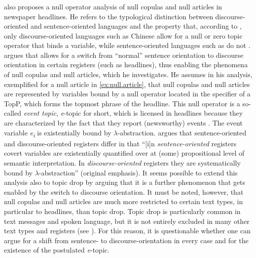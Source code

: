 \largerpage
\subsubsection{\citet{reich2017}}
\citet{reich2017} also proposes a null operator analysis of null copulas and null articles in newspaper headlines. 
He refers to the typological distinction between discourse-oriented and sentence-oriented languages \citep{tsao1977, huang1984} and the property that, according to \citet[545]{huang1984}, only discourse-oriented languages such as Chinese  allow for a null or zero topic operator that binds a variable, while sentence-oriented languages such as  do not \citep[192]{reich2017}.
\citet[193]{reich2017} argues that  allows for a switch from ``normal'' sentence orientation to discourse orientation in certain registers (such as headlines), thus enabling the phenomena of null copulas and null articles, which he investigates.
He assumes in his analysis, exemplified for a null article in \ref{ex:null.article}, that null copulas and null articles are represented by variables bound by a null operator located in the specifier of a TopP, which forms the topmost phrase of the headline.
This null operator is a so-called \textit{event topic}, \textit{e}-topic for short, which is licensed in headlines because they are characterized by the fact that they report (newsworthy) events \citep[193]{reich2017}.
The event variable \textit{e\textsubscript{i}} is existentially bound by $\lambda$-abstraction.
\citet[194]{reich2017} argues that sentence-oriented and discourse-oriented registers differ in that ``[i]n \textit{sentence-oriented} registers covert variables are existentially quantified over at (some) propositional level of semantic interpretation.
In \textit{discourse-oriented} registers they are systematically bound by $\lambda$-abstraction'' (original emphasis).
It seems possible to extend this analysis also to topic drop by arguing that it is a further phenomenon that gets enabled by the switch to discourse orientation.
It must be noted, however, that null copulas and null articles are much more restricted to certain text types,  in particular to headlines, than topic drop.
Topic drop is particularly common in text messages and spoken language, but it is not entirely excluded in many other text types and registers (see ). 
For this reason, it is questionable whether one can argue for a shift from sentence- to discourse-orientation in every case and for the existence of the postulated \textit{e}-topic.
\largerpage

